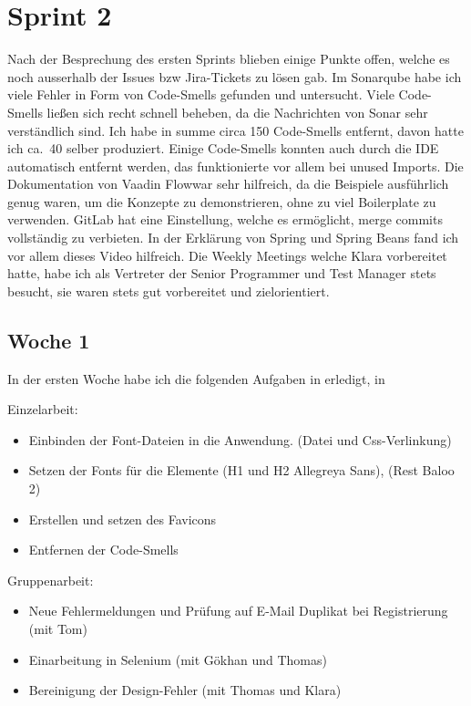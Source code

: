 

\section{Sprint 2}\label{sec:sprint2}
Nach der Besprechung des ersten Sprints blieben einige Punkte offen, welche es noch ausserhalb der Issues bzw Jira-Tickets zu lösen gab.
Im Sonarqube habe ich viele Fehler in Form von Code-Smells gefunden und untersucht.
Viele Code-Smells ließen sich recht schnell beheben, da die Nachrichten von Sonar sehr verständlich sind.
Ich habe in summe circa 150 Code-Smells entfernt, davon hatte ich ca.\ 40 selber produziert.
Einige Code-Smells konnten auch durch die IDE automatisch entfernt werden, das funktionierte vor allem bei unused Imports.
Die Dokumentation von Vaadin Flow\cite*[]{flowdocumentation}war sehr hilfreich, da die Beispiele ausführlich genug waren,
um die Konzepte zu demonstrieren, ohne zu viel Boilerplate zu verwenden.
GitLab hat eine Einstellung, welche es ermöglicht, merge commits vollständig zu verbieten.
In der Erklärung von Spring und Spring Beans fand ich vor allem dieses Video\cite*[]{springvideo} hilfreich.
Die Weekly Meetings welche Klara vorbereitet hatte, habe ich als Vertreter der Senior Programmer
und Test Manager stets besucht, sie waren stets gut vorbereitet und zielorientiert.
\subsection{Woche 1}\label{subsec:s2w1}
In der ersten Woche habe ich die folgenden Aufgaben in erledigt, in

Einzelarbeit:
\begin{itemize}
    \item Einbinden der Font-Dateien in die Anwendung. (Datei und Css-Verlinkung)
    \item Setzen der Fonts für die Elemente (H1 und H2 Allegreya Sans), (Rest Baloo 2)
    \item Erstellen und setzen des Favicons
    \item Entfernen der Code-Smells

\end{itemize}

Gruppenarbeit:

\begin{itemize}
    \item Neue Fehlermeldungen und Prüfung auf E-Mail Duplikat bei Registrierung (mit Tom)
    \item Einarbeitung in Selenium (mit Gökhan und Thomas)
    \item Bereinigung der Design-Fehler (mit Thomas und Klara)
\end{itemize}
\pagebreak

